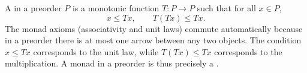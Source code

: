 A  in a preorder $P$ is a monotonic function $T: P \to P$ such that for all $x \in P$,
$$
x \leq Tx, \qquad T(Tx) \leq Tx.
$$
The monad axioms (associativity and unit laws) commute automatically because in a preorder there is at most one arrow between any two objects. The condition $x \leq Tx$ corresponds to the unit law, while $T(Tx) \leq Tx$ corresponds to the multiplication. A monad in a preorder is thus precisely a .
